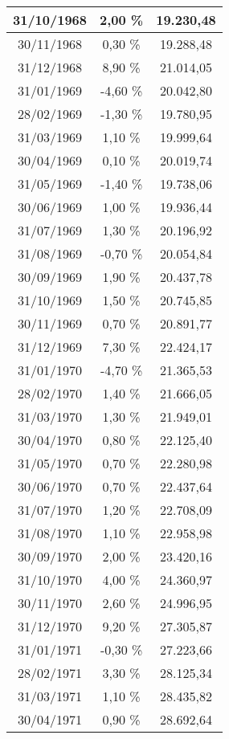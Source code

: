 \begin{center}
\begin{longtable}{|c|c|c|}
31/10/1968 & 2,00 \% & 19.230,48  \\ \hline
30/11/1968 & 0,30 \% & 19.288,48  \\ \hline
31/12/1968 & 8,90 \% & 21.014,05  \\ \hline
31/01/1969 & -4,60 \% & 20.042,80  \\ \hline
28/02/1969 & -1,30 \% & 19.780,95  \\ \hline
31/03/1969 & 1,10 \% & 19.999,64  \\ \hline
30/04/1969 & 0,10 \% & 20.019,74  \\ \hline
31/05/1969 & -1,40 \% & 19.738,06  \\ \hline
30/06/1969 & 1,00 \% & 19.936,44  \\ \hline
31/07/1969 & 1,30 \% & 20.196,92  \\ \hline
31/08/1969 & -0,70 \% & 20.054,84  \\ \hline
30/09/1969 & 1,90 \% & 20.437,78  \\ \hline
31/10/1969 & 1,50 \% & 20.745,85  \\ \hline
30/11/1969 & 0,70 \% & 20.891,77  \\ \hline
31/12/1969 & 7,30 \% & 22.424,17  \\ \hline
31/01/1970 & -4,70 \% & 21.365,53  \\ \hline
28/02/1970 & 1,40 \% & 21.666,05  \\ \hline
31/03/1970 & 1,30 \% & 21.949,01  \\ \hline
30/04/1970 & 0,80 \% & 22.125,40  \\ \hline
31/05/1970 & 0,70 \% & 22.280,98  \\ \hline
30/06/1970 & 0,70 \% & 22.437,64  \\ \hline
31/07/1970 & 1,20 \% & 22.708,09  \\ \hline
31/08/1970 & 1,10 \% & 22.958,98  \\ \hline
30/09/1970 & 2,00 \% & 23.420,16  \\ \hline
31/10/1970 & 4,00 \% & 24.360,97  \\ \hline
30/11/1970 & 2,60 \% & 24.996,95  \\ \hline
31/12/1970 & 9,20 \% & 27.305,87  \\ \hline
31/01/1971 & -0,30 \% & 27.223,66  \\ \hline
28/02/1971 & 3,30 \% & 28.125,34  \\ \hline
31/03/1971 & 1,10 \% & 28.435,82  \\ \hline
30/04/1971 & 0,90 \% & 28.692,64  \\ \hline

\end{longtable}
\end{center}
